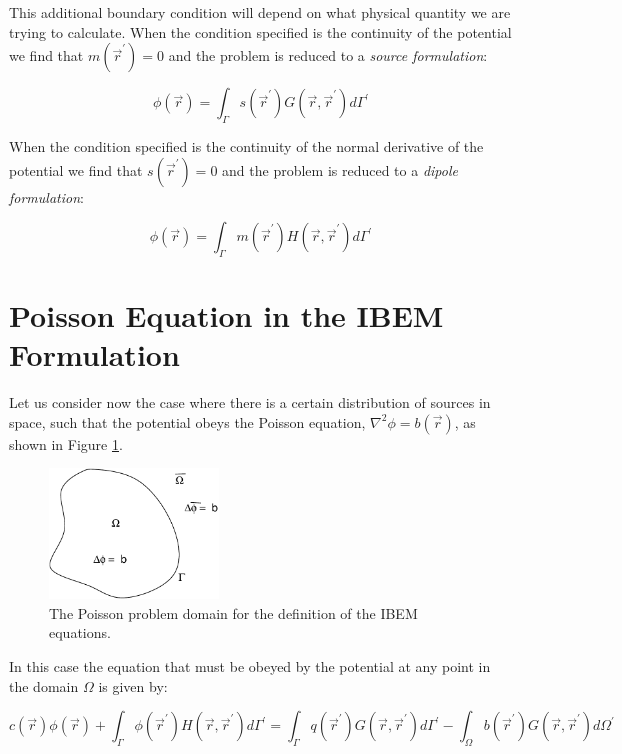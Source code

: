 \documentclass[12pt]{report}
\begin{document}
This additional boundary condition will depend on what physical quantity we are trying to calculate. When the condition specified is the continuity of the potential we find that $m(\vec{r}^\prime)=0$ and the problem is reduced to a \textit{source formulation}:

\begin{equation}
\phi(\vec{r})=\int_\Gamma{s(\vec{r}^\prime)G(\vec{r},\vec{r}^\prime)d\Gamma^\prime}\label{ibem_source_final}
\end{equation}

When the condition specified is the continuity of the normal derivative of the potential we find that $s(\vec{r}^\prime)=0$ and the problem is reduced to a \textit{dipole formulation}:

\begin{equation}
\phi(\vec{r})=\int_\Gamma{m(\vec{r}^\prime)H(\vec{r},\vec{r}^\prime)d\Gamma^\prime}\label{ibem_dipole_final}
\end{equation}


\section{Poisson Equation in the IBEM Formulation}\label{sec_poisson}
Let us consider now the case where there is a certain distribution of sources in space, such that the potential obeys the Poisson equation, $\nabla^2\phi=b(\vec{r})$, as shown in Figure \ref{ibem_poisson_fig}. 

\begin{figure}[hbt]
\begin{center}
\includegraphics[width=0.4\textwidth]{ibem_domain_poisson.pdf}
\end{center}
\caption{The Poisson problem domain for the definition of the IBEM equations.}
\label{ibem_poisson_fig}
\end{figure}

In this case the equation that must be obeyed by the potential at any point in the domain $\Omega$ is given by:

\begin{equation}c(\vec{r})\phi(\vec{r})+\int_\Gamma{\phi(\vec{r}^\prime)H(\vec{r},\vec{r}^\prime)d\Gamma^\prime}=\int_\Gamma{q(\vec{r}^\prime)G(\vec{r},\vec{r}^\prime)d\Gamma^\prime}-\int_\Omega{b(\vec{r}^\prime)G(\vec{r},\vec{r}^\prime)d\Omega^\prime}\label{dbem_poisson_in}\end{equation}
\end{document}
